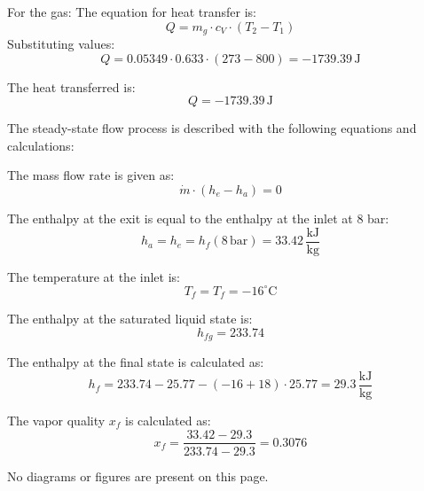 For the gas:  
The equation for heat transfer is:  
\[
Q = m_g \cdot c_V \cdot (T_2 - T_1)
\]  
Substituting values:  
\[
Q = 0.05349 \cdot 0.633 \cdot (273 - 800) = -1739.39 \, \text{J}
\]  

The heat transferred is:  
\[
Q = -1739.39 \, \text{J}
\]

The steady-state flow process is described with the following equations and calculations:  

The mass flow rate is given as:  
\[
\dot{m} \cdot (h_e - h_a) = 0
\]  

The enthalpy at the exit is equal to the enthalpy at the inlet at 8 bar:  
\[
h_a = h_e = h_f(8 \, \text{bar}) = 33.42 \, \frac{\text{kJ}}{\text{kg}}
\]  

The temperature at the inlet is:  
\[
T_f = T_f = -16^\circ\text{C}
\]  

The enthalpy at the saturated liquid state is:  
\[
h_{fg} = 233.74
\]  

The enthalpy at the final state is calculated as:  
\[
h_f = 233.74 - 25.77 - (-16 + 18) \cdot 25.77 = 29.3 \, \frac{\text{kJ}}{\text{kg}}
\]  

The vapor quality \( x_f \) is calculated as:  
\[
x_f = \frac{33.42 - 29.3}{233.74 - 29.3} = 0.3076
\]  

No diagrams or figures are present on this page.